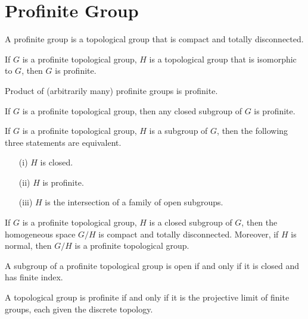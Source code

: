 \chapter{Profinite Group}

\begin{definition}
	\leanok
	A profinite group is a topological group that is compact and totally disconnected.
\end{definition}

\begin{lemma}
	\leanok
	If $G$ is a profinite topological group, $H$ is a topological group that is isomorphic to $G$, then $G$ is profinite.
\end{lemma}

\begin{lemma}
	Product of (arbitrarily many) profinite groups is profinite.
\end{lemma}

\begin{lemma}
	\leanok
	If $G$ is a profinite topological group, then any closed subgroup of $G$ is profinite.
\end{lemma}

\begin{theorem}
	If $G$ is a profinite topological group, $H$ is a subgroup of $G$, then the following three statements
	are equivalent.
	\begin{itemize}
		\item[(i)] $ H $ is closed.
		\item[(ii)] $ H $ is profinite.
		\item[(iii)] $ H $ is the intersection of a family of open subgroups.
	\end{itemize}
\end{theorem}

\begin{lemma}
	If $G$ is a profinite topological group, $H$ is a closed subgroup of $G$, then the homogeneous space $G / H$ is compact and totally disconnected. Moreover, if $H$ is normal, then $G / H$ is a profinite topological group.
\end{lemma}

\begin{lemma}
	A subgroup of a profinite topological group is open if and only if it is closed and has finite index.
\end{lemma}

\begin{theorem}
	A topological group is profinite if and only if it is the projective limit of finite groups, each given the discrete topology.
\end{theorem}
